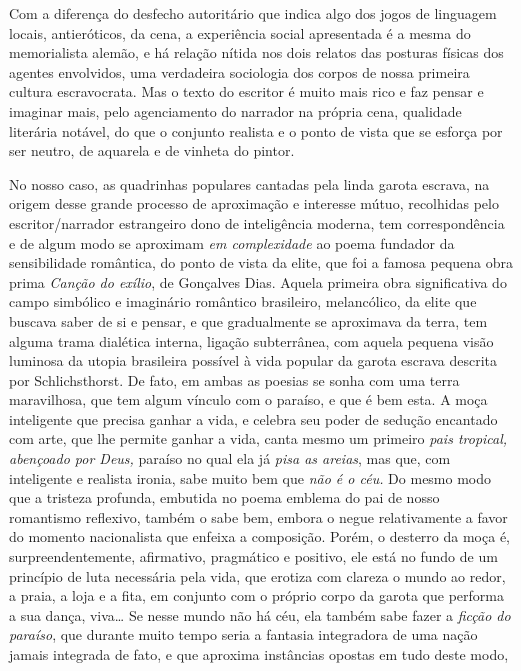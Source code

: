 Com a diferença do desfecho autoritário que indica algo dos jogos de
linguagem locais, antieróticos, da cena, a experiência social
apresentada é a mesma do memorialista alemão, e há relação nítida nos
dois relatos das posturas físicas dos agentes envolvidos, uma verdadeira
sociologia dos corpos de nossa primeira cultura escravocrata. Mas o
texto do escritor é muito mais rico e faz pensar e imaginar mais, pelo
agenciamento do narrador na própria cena, qualidade literária notável,
do que o conjunto realista e o ponto de vista que se esforça por ser
neutro, de aquarela e de vinheta do pintor.

No nosso caso, as quadrinhas populares cantadas pela linda garota
escrava, na origem desse grande processo de aproximação e interesse
mútuo, recolhidas pelo escritor/narrador estrangeiro dono de
inteligência moderna, tem correspondência e de algum modo se aproximam
\emph{em complexidade} ao poema fundador da sensibilidade romântica, do
ponto de vista da elite, que foi a famosa pequena obra prima
\emph{Canção do exílio}, de Gonçalves Dias. Aquela primeira obra
significativa do campo simbólico e imaginário romântico brasileiro,
melancólico, da elite que buscava saber de si e pensar, e que
gradualmente se aproximava da terra, tem alguma trama dialética interna,
ligação subterrânea, com aquela pequena visão luminosa da utopia
brasileira possível à vida popular da garota escrava descrita por
Schlichsthorst. De fato, em ambas as poesias se sonha com uma terra
maravilhosa, que tem algum vínculo com o paraíso, e que é bem esta. A
moça inteligente que precisa ganhar a vida, e celebra seu poder de
sedução encantado com arte, que lhe permite ganhar a vida, canta mesmo
um primeiro \emph{pais tropical, abençoado por Deus,} paraíso no qual
ela já \emph{pisa as areias}, mas que, com inteligente e realista
ironia, sabe muito bem que \emph{não é o céu.} Do mesmo modo que a
tristeza profunda, embutida no poema emblema do pai de nosso romantismo
reflexivo, também o sabe bem, embora o negue relativamente a favor do
momento nacionalista que enfeixa a composição. Porém, o desterro da moça
é, surpreendentemente, afirmativo, pragmático e positivo, ele está no
fundo de um princípio de luta necessária pela vida, que erotiza com
clareza o mundo ao redor, a praia, a loja e a fita, em conjunto com o
próprio corpo da garota que performa a sua dança, viva\ldots{} Se nesse mundo
não há céu, ela também sabe fazer a \emph{ficção do paraíso}, que
durante muito tempo seria a fantasia integradora de uma nação jamais
integrada de fato, e que aproxima instâncias opostas em tudo deste modo,
